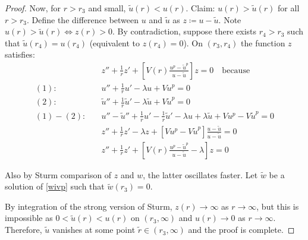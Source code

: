 \begin{lemma}
\begin{proof}
Now, for $r>r_3$ and small, $\tilde u(r)<u(r)$.
Claim: $u(r)>\tilde u(r)$ for all $r>r_3$.
Define the difference between $u$ and $\tilde u$ as $z\coloneqq u-\tilde u$.
Note $u(r)>\tilde u(r)\iff z(r)>0$.
By contradiction, suppose there exists $r_4>r_3$ such that $\tilde u(r_4)=u(r_4)$ (equivalent to $z(r_4)=0$).
On $(r_3,r_4)$ the function $z$ satisfies:
\begin{align*}
	&z''+\frac{1}{r}z'+\left[V(r)\frac{u^p-\tilde u^p}{u-\tilde u}\right]z = 0\quad\mathrm{because} \\
	(1):\quad &u'' + \frac{1}{r}u' -\lambda u + Vu^p = 0 \\
	(2):\quad &\tilde u'' + \frac{1}{r}\tilde u' -\lambda\tilde u + V\tilde u^p = 0\\
	(1) - (2):\quad &u'' - \tilde u'' + \frac{1}{r}u' - \frac{1}{r}\tilde u' -\lambda u + \lambda\tilde u + Vu^p - V\tilde u^p = 0\\
	 &z'' + \frac{1}{r}z' -\lambda z + \left[Vu^p - V\tilde u^p\right]
	\frac{u-\tilde u}{u-\tilde u} = 0\\
	 &z'' + \frac{1}{r}z' + \left[V(r)\frac{u^p-\tilde u^p}{u-\tilde u}-\lambda\right]z = 0
\end{align*}

\seperate


Also by Sturm comparison of $z$ and $w$, the latter oscillates faster.
Let $\tilde w$ be a solution of \eqref{wivp} such that $\tilde w(r_3)=0$.

\seperate

By integration of the strong version of Sturm, $z(r)\to\infty$ as $r\to\infty$,
but this is impossible as $0<\tilde u(r)<u(r)$ on $(r_3,\infty)$ and $u(r)\to0$ as $r\to\infty$.
Therefore, $\tilde u$ vanishes at some point $\tilde r\in(r_3,\infty)$
and the proof is complete.


\end{proof}
\end{lemma}
